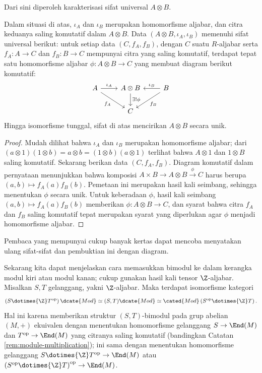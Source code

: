 Dari sini diperoleh karakterisasi sifat universal $A \otimes B$.
\begin{proposition}\label{prop:algebra-otimes-univ}
	Dalam situasi di atas, $\iota_A$ dan $\iota_B$ merupakan homomorfisme aljabar, dan citra keduanya saling komutatif dalam $A \otimes B$. Data $(A \otimes B, \iota_A, \iota_B)$ memenuhi sifat universal berikut: untuk setiap data $(C, f_A, f_B)$, dengan $C$ suatu $R$-aljabar serta $f_A: A \to C$ dan $f_B: B \to C$ mempunyai citra yang saling komutatif, terdapat tepat satu homomorfisme aljabar $\phi: A \otimes B \to C$ yang membuat diagram berikut komutatif:
	\[\begin{tikzcd}
	A \arrow[r, "\iota_A"] \arrow[rd, "f_A"'] & A \otimes B \arrow[d, "\exists! \phi"] & B \arrow[l, "\iota_B"'] \arrow[ld, "f_B"] \\
	& C &
	\end{tikzcd}\]
	Hingga isomorfisme tunggal, sifat di atas mencirikan $A \otimes B$ secara unik.
\end{proposition}
\begin{proof}
	Mudah dilihat bahwa $\iota_A$ dan $\iota_B$ merupakan homomorfisme aljabar; dari $(a \otimes 1)(1 \otimes b) = a \otimes b = (1 \otimes b)(a \otimes 1)$ terlihat bahwa $A \otimes 1$ dan $1 \otimes B$ saling komutatif. Sekarang berikan data $(C, f_A, f_B)$. Diagram komutatif dalam pernyataan menunjukkan bahwa komposisi $A \times B \to A \otimes B \xrightarrow{\phi} C$ harus berupa $(a, b) \mapsto f_A(a)f_B(b)$. Pemetaan ini merupakan hasil kali seimbang, sehingga menentukan $\phi$ secara unik. Untuk keberadaan $\phi$, hasil kali seimbang $(a, b) \mapsto f_A(a)f_B(b)$ memberikan $\phi: A \otimes B \to C$, dan syarat bahwa citra $f_A$ dan $f_B$ saling komutatif tepat merupakan syarat yang diperlukan agar $\phi$ menjadi homomorfisme aljabar.
\end{proof}
Pembaca yang mempunyai cukup banyak kertas dapat mencoba menyatakan ulang sifat-sifat dan pembuktian ini dengan diagram.

\begin{remark}\label{rem:bimodule-as-module}
	Sekarang kita dapat menjelaskan cara memasukkan bimodul ke dalam kerangka modul kiri atau modul kanan; cukup gunakan hasil kali tensor $\Z$-aljabar. Misalkan $S, T$ gelanggang, yakni $\Z$-aljabar. Maka terdapat isomorfisme kategori
	\[ \left(S \dotimes{\Z} T^\text{op}\right)\dcate{Mod} \simeq (S,T)\dcate{Mod} \simeq \cated{Mod}\left(S^\text{op} \dotimes{\Z} T\right). \]
	Hal ini karena memberikan struktur $(S,T)$-bimodul pada grup abelian $(M,+)$ ekuivalen dengan menentukan homomorfisme gelanggang $S \to \End(M)$ dan $T^\text{op} \to \End(M)$ yang citranya saling komutatif (bandingkan Catatan \ref{rem:module-multiplication}); ini sama dengan menentukan homomorfisme gelanggang $S \dotimes{\Z} T^\text{op} \to \End(M)$ atau $\left( S^\text{op} \dotimes{\Z} T \right)^\text{op} \to \End(M)$.
\end{remark}

